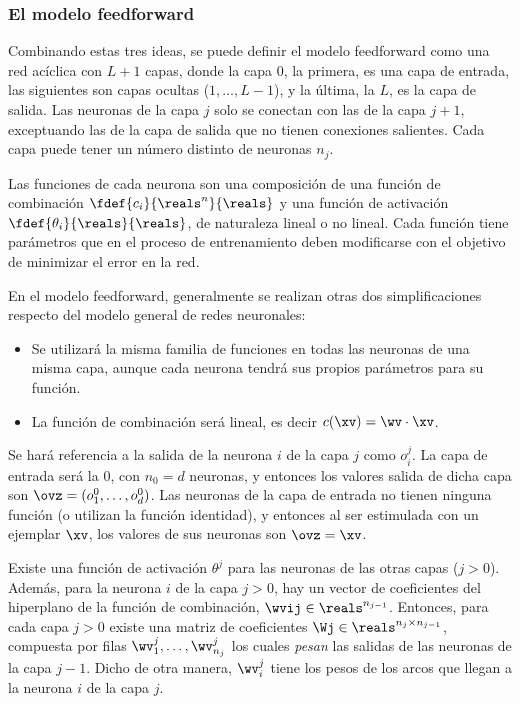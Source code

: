 \subsubsection{El modelo feedforward}

Combinando estas tres ideas, se puede definir el modelo feedforward como una red acíclica con $L+1$ capas, donde la capa $0$, la primera, es una capa de entrada, las siguientes son capas ocultas ($1,\dots,L-1$), y la última, la $L$, es la capa de salida. Las neuronas de la capa $j$ solo se conectan con las de la capa $j+1$, exceptuando las de la capa de salida que no tienen conexiones salientes. Cada capa puede tener un número distinto de neuronas $n_j$. 

Las funciones de cada neurona son una composición de una función de combinación $\fdef{c_i}{\reals^n}{\reals}$ y una función de activación $\fdef{\theta_i}{\reals}{\reals}$, de naturaleza lineal o no lineal. Cada función tiene parámetros que en el proceso de entrenamiento deben modificarse con el objetivo de minimizar el error en la red. 

En el modelo feedforward, generalmente se realizan otras dos simplificaciones respecto del modelo general de redes neuronales:

\begin{itemize}
\item Se utilizará la misma familia de funciones en todas las neuronas de una misma capa, aunque cada neurona tendrá sus propios parámetros para su función. 

\item La función de combinación será lineal, es decir $c(\xv)= \wv \cdot \xv$.
\end{itemize}




Se hará referencia a la salida de la neurona $i$ de la capa $j$ como $o_i^j$. 
La capa de entrada será la $0$, con $n_0=d$ neuronas, y entonces los valores salida de dicha capa son $\ovz=(o_1^0,\dots,o_d^0)$. Las neuronas de la capa de entrada no tienen ninguna función (o utilizan la función identidad), y entonces al ser estimulada con un ejemplar $\xv$, los valores de sus neuronas son $\ovz=\xv$.

Existe una función de activación $\theta^j$ para las neuronas de las otras capas ($j>0$). Además, para la neurona $i$ de la capa $j>0$, hay un vector de coeficientes del hiperplano de la función de combinación, $\wvij \in \reals^{n_{j-1}}$. Entonces, para cada capa $j>0$ existe una matriz de coeficientes $\Wj \in \reals^{n_j \times n_{j-1}}$, compuesta por filas $\wv_1^j,\dots,\wv_{n_j}^j$  los cuales \textit{pesan} las salidas de las neuronas de la capa $j-1$. Dicho de otra manera, $\wv_i^j$ tiene los pesos de los arcos que llegan a la neurona $i$ de la capa $j$.

